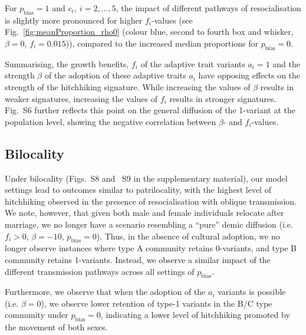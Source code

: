 \documentclass[9pt,twocolumn,twoside,lineno]{pnas-new}
\begin{document}
For $p_\text{bias}=1$ and $c_i,\ i = 2,\dots,5$, the impact of different pathways of resocialisation is slightly more pronounced for higher $f_i$-values (see Fig.~\ref{fig:meanProportion_rho0} (colour blue, second to fourth box and whisker, $\beta=0$, $f_i=0.015$)), compared to the increased median proportions for $p_\text{bias} = 0$.

Summarising, the growth benefits, $f_i$ of the adaptive trait variants $a_i=1$ and the strength $\beta$ of the adoption of these adaptive traits $a_i$ have opposing effects on the strength of the hitchhiking signature. While increasing the values of $\beta$ results in weaker signatures, increasing the values of $f_i$ results in stronger signatures. Fig.~S6 further reflects this point on the general diffusion of the 1-variant at the population level, showing the negative correlation between $\beta$- and $f_i$-values.


\subsection*{Bilocality}

Under bilocality (Figs.~S8 and ~S9 in the supplementary material), our model settings lead to outcomes similar to patrilocality, with the highest level of hitchhiking observed in the presence of resocialisation with oblique transmission. We note, however, that given both male and female individuals relocate after marriage, we no longer have a scenario resembling a ``pure'' demic diffusion (i.e. $f_i>0$, $\beta=-10$, $p_\text{bias}=0$). Thus, in the absence of cultural adoption, we no longer observe instances where type A community retains 0-variants, and type B community retains 1-variants. Instead, we observe a similar impact of the different transmission pathways across all settings of $p_\text{bias}$. 

Furthermore, we observe that when the adoption of the $a_i$ variants is possible (i.e. $\beta=0$), we observe lower retention of type-1 variants in the B/C type community under $p_\text{bias}=0$, indicating a lower level of hitchhiking promoted by the movement of both sexes.
\end{document}
